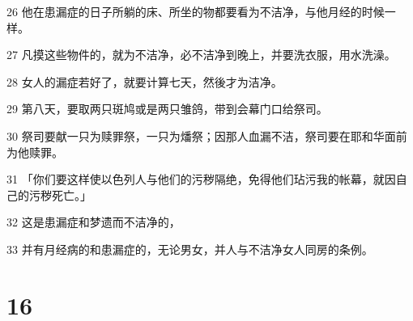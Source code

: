\par 26 他在患漏症的日子所躺的床、所坐的物都要看为不洁净，与他月经的时候一样。
\par 27 凡摸这些物件的，就为不洁净，必不洁净到晚上，并要洗衣服，用水洗澡。
\par 28 女人的漏症若好了，就要计算七天，然後才为洁净。
\par 29 第八天，要取两只斑鸠或是两只雏鸽，带到会幕门口给祭司。
\par 30 祭司要献一只为赎罪祭，一只为燔祭；因那人血漏不洁，祭司要在耶和华面前为他赎罪。
\par 31 「你们要这样使以色列人与他们的污秽隔绝，免得他们玷污我的帐幕，就因自己的污秽死亡。」
\par 32 这是患漏症和梦遗而不洁净的，
\par 33 并有月经病的和患漏症的，无论男女，并人与不洁净女人同房的条例。

\chapter{16}

